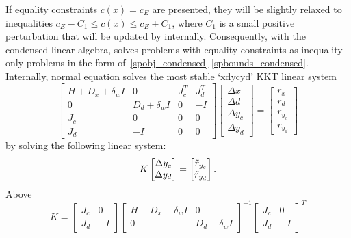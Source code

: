  If equality constraints $c(x)=c_E$ are presented, they will be slightly relaxed to inequalities $c_E - C_1\leq c(x)\leq c_E+C_1$, where $C_1$ is a small positive perturbation that will be updated by \Hi internally. Consequently, with the condensed linear algebra, \Hi solves problems with equality constraints as inequality-only problems in the form of~\eqref{spobj_condensed}-\eqref{spbounds_condensed}.\\

Internally, normal equation solves the most stable `xdycyd' KKT linear system 
\begin{equation} \label{KKT_xdycyd_normaleqn}
  \begin{bmatrix}
    H+D_x+\delta_{w}I & 0 & J_c^T & J_d^T\\
    0  & D_d + \delta_{w}I &  0    &  -I\\
    J_c & 0 & 0 & 0\\
    J_d & -I & 0 & 0
  \end{bmatrix}
  \begin{bmatrix} \Delta x \\ \Delta d \\ \Delta y_c \\ \Delta y_d  \end{bmatrix} = 
  \begin{bmatrix} r_x \\ r_d \\ r_{y_c} \\ r_{y_d}\end{bmatrix}
\end{equation}
by solving the following  linear system:
\begin{equation} \label{KKT_normaleqn}
  K
  \begin{bmatrix} \Delta y_c \\ \Delta y_d  \end{bmatrix} 
  = 
  \begin{bmatrix} \tilde{r}_{y_c} \\ \tilde{r}_{y_d}\end{bmatrix}. \\
\end{equation}
Above
\begin{equation} \label{KKT_normaleqn_mat}
  K = 
  \begin{bmatrix}
    J_c & 0 \\
    J_d & -I 
  \end{bmatrix}
  \begin{bmatrix}
    H+D_x+\delta_{w}I & 0 \\
    0  & D_d + \delta_{w}I
  \end{bmatrix}^{-1}
  \begin{bmatrix}
    J_c & 0 \\
    J_d & -I 
  \end{bmatrix}^T
\end{equation}
